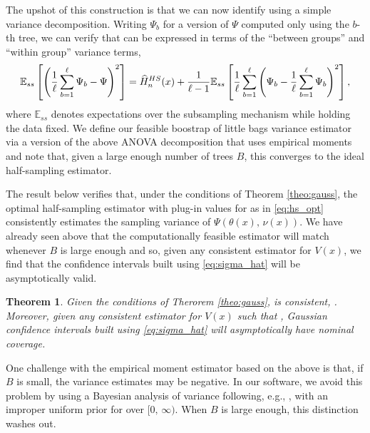 \documentclass[aos]{imsart}
\theoremstyle{plain}
\newtheorem{theo}[prop]{Theorem}
\theoremstyle{definition}
\theoremstyle{remark}
\begin{document}
\begin{CJK}{UTF8}{gbsn}
The upshot of this construction is that we can now identify 
using a simple variance decomposition. Writing $\Psi_b$ for a version of $\Psi$
computed only using the $b$-th tree, we can verify that  can
be expressed in terms of the ``between groups'' and ``within group'' variance terms,
\begin{equation*}
\EE[ss]{\p{\frac{1}{\ell} \sum_{b = 1}^\ell \Psi_b - \Psi}^2} = \hH_n^{HS}(x) + \frac{1}{\ell - 1} \EE[ss]{\frac{1}{\ell} \sum_{b = 1}^\ell\p{\Psi_b -\frac{1}{\ell} \sum_{b = 1}^\ell \Psi_b}^2},
\end{equation*}
where $\mathbb{E}_{ss}$ denotes expectations over the subsampling mechanism while
holding the data fixed. We define our feasible boostrap of little bags variance estimator
 via a version of the above ANOVA decomposition that uses empirical moments
and note that, given a large enough number of trees $B$, this converges to the ideal
half-sampling estimator.

The result below verifies that, under the conditions of Theorem \ref{theo:gauss},
the optimal half-sampling estimator 
with plug-in values for  as in \eqref{eq:hs_opt}
consistently estimates the sampling variance of $\Psi(\theta(x), \, \nu(x))$.
We have already seen above that the computationally feasible estimator
 will match  whenever $B$ is large enough and so,
given any consistent estimator  for $V(x)$, we find that the confidence
intervals built using \eqref{eq:sigma_hat} will be asymptotically valid.

\begin{theo}
\label{theo:blb}
Given the conditions of Therorem \ref{theo:gauss},  is consistent,
.
Moreover, given any consistent  estimator for $V(x)$ such that
, Gaussian confidence intervals
built using \eqref{eq:sigma_hat} will asymptotically have nominal coverage.
\end{theo}

One challenge with the empirical moment estimator
based on the above is that, if $B$ is small, the variance estimates
 may be negative. In our software, we avoid this problem
by using a Bayesian analysis of variance following, e.g., \citet{gelman2014bayesian},
with an improper uniform prior for  over $[0, \, \infty)$.
When $B$ is large enough, this distinction washes out.



\end{CJK}
\end{document}
